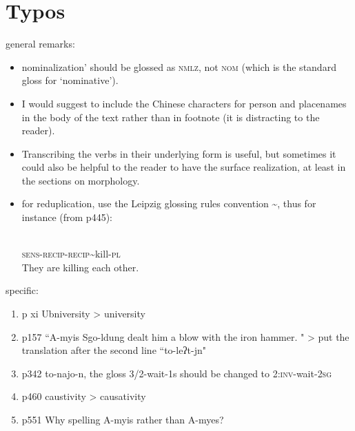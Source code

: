 \documentclass[oldfontcommands,oneside,a4paper,11pt]{article}
\newcommand{\ipa}[1]{{\phon \mbox{#1}}} %
\begin{document}
\section{Typos}
general remarks:
\begin{itemize}
\item  nominalization' should be glossed as \textsc{nmlz}, not \textsc{nom} (which is the standard gloss for `nominative').
\item I would suggest to include the Chinese characters for person and placenames in the body of the text rather than in footnote (it is distracting to the reader).
 \item Transcribing the verbs in their underlying form is useful, but sometimes it could also be helpful to the reader to have the surface realization, at least in the sections on morphology.
 \item for reduplication, use the Leipzig glossing rules convention \textasciitilde{}, thus for instance (from p445):
\begin{exe}
\ex  
\gll \ipa{ná-ŋa-sa\textasciitilde{}sat-ɲ} \\
\textsc{sens-recip}-\textsc{recip}\textasciitilde{}kill-\textsc{pl} \\
\glt  They are killing each other. 
\end{exe} 
\end{itemize} 
 specific:
\begin{enumerate}
\item p xi Ubniversity > university
\item  p157 ``A-myis Sgo-ldung dealt him a blow with the iron hammer. " > put the translation after the second line ``to-leʔt-jn"
\item p342 \ipa{to-najo-n}, the gloss 3/2-wait-1s should be changed to  \textsc{2:inv}-wait-\textsc{2sg}
\item p460 caustivity > causativity
\item p551 Why spelling A-myis rather  than A-myes?
\end{enumerate}  
  
  


\end{document}
